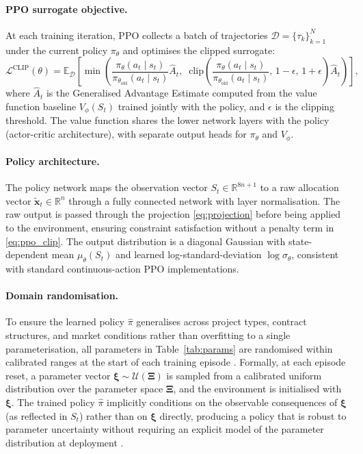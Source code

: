 \paragraph{PPO surrogate objective.}
At each training iteration, PPO collects a batch of trajectories
$\mathcal{D} = \{\tau_k\}_{k=1}^{N}$ under the current policy
$\pi_\theta$ and optimises the clipped surrogate:
\begin{equation}
  \mathcal{L}^{\mathrm{CLIP}}(\theta)
    = \mathbb{E}_{\mathcal{D}}\!\left[
        \min\!\left(
          \frac{\pi_\theta(a_t \mid s_t)}
               {\pi_{\theta_{\mathrm{old}}}(a_t \mid s_t)}
          \hat{A}_t,\;\;
          \mathrm{clip}\!\left(
            \frac{\pi_\theta(a_t \mid s_t)}
                 {\pi_{\theta_{\mathrm{old}}}(a_t \mid s_t)},\,
            1-\epsilon,\, 1+\epsilon
          \right)\hat{A}_t
        \right)
      \right],
  \label{eq:ppo_clip}
\end{equation}
where $\hat{A}_t$ is the Generalised Advantage Estimate
\citep{Schulman2016} computed from the value function baseline
$V_\phi(S_t)$ trained jointly with the policy, and $\epsilon$ is the
clipping threshold. The value function shares the lower network layers
with the policy (actor-critic architecture), with separate output
heads for $\pi_\theta$ and $V_\phi$.

\paragraph{Policy architecture.}
The policy network maps the observation vector $S_t \in \mathbb{R}^{8n+1}$
to a raw allocation vector $\tilde{\mathbf{x}}_t \in \mathbb{R}^n$
through a fully connected network with layer normalisation. The raw
output is passed through the projection \eqref{eq:projection} before
being applied to the environment, ensuring constraint satisfaction
without a penalty term in \eqref{eq:ppo_clip}. The output
distribution is a diagonal Gaussian with state-dependent mean
$\mu_\theta(S_t)$ and learned log-standard-deviation
$\log\sigma_\theta$, consistent with standard continuous-action PPO
implementations.

\paragraph{Domain randomisation.}
To ensure the learned policy $\hat{\pi}$ generalises across project
types, contract structures, and market conditions rather than
overfitting to a single parameterisation, all parameters in
Table~\ref{tab:params} are randomised within calibrated ranges at the
start of each training episode \citep{Tobin2017}. Formally, at each
episode reset, a parameter vector
$\boldsymbol{\xi} \sim \mathcal{U}(\boldsymbol{\Xi})$ is sampled from
a calibrated uniform distribution over the parameter space
$\boldsymbol{\Xi}$, and the environment is initialised with
$\boldsymbol{\xi}$. The trained policy $\hat{\pi}$ implicitly
conditions on the observable consequences of $\boldsymbol{\xi}$ (as
reflected in $S_t$) rather than on $\boldsymbol{\xi}$ directly,
producing a policy that is robust to parameter uncertainty without
requiring an explicit model of the parameter distribution at
deployment \citep{Tobin2017}.

